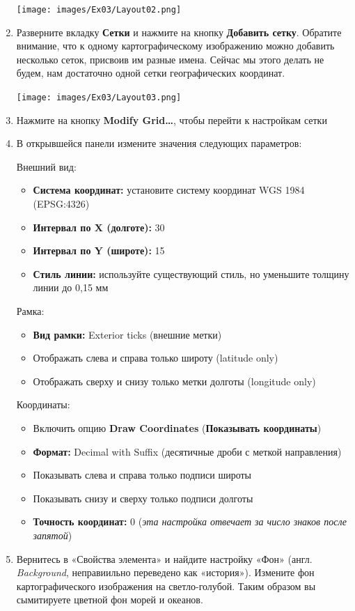 \documentclass[
  12pt,
]{book}
\providecommand{\tightlist}{%
  \setlength{\itemsep}{0pt}\setlength{\parskip}{0pt}}
\begin{document}
\begin{enumerate}
  \texttt{[image: images/Ex03/Layout02.png]}
\item
  Разверните вкладку \textbf{Сетки} и нажмите на кнопку \textbf{Добавить сетку}. Обратите внимание, что к одному картографическому изображению можно добавить несколько сеток, присвоив им разные имена. Сейчас мы этого делать не будем, нам достаточно одной сетки географических координат.

  \texttt{[image: images/Ex03/Layout03.png]}
\item
  Нажмите на кнопку \textbf{Modify Grid\ldots{}}, чтобы перейти к настройкам сетки
\item
  В открывшейся панели измените значения следующих параметров:

  Внешний вид:

  \begin{itemize}
  \tightlist
  \item
    \textbf{Система координат:} установите систему координат WGS 1984 (EPSG:4326)
  \item
    \textbf{Интервал по X (долготе):} 30
  \item
    \textbf{Интервал по Y (широте):} 15
  \item
    \textbf{Стиль линии:} используйте существующий стиль, но уменьшите толщину линии до 0,15 мм
  \end{itemize}

  Рамка:

  \begin{itemize}
  \tightlist
  \item
    \textbf{Вид рамки:} Exterior ticks (внешние метки)
  \item
    Отображать слева и справа только широту (latitude only)
  \item
    Отображать сверху и снизу только метки долготы (longitude only)
  \end{itemize}

  Координаты:

  \begin{itemize}
  \tightlist
  \item
    Включить опцию \textbf{Draw Coordinates} (\textbf{Показывать координаты})
  \item
    \textbf{Формат:} Decimal with Suffix (десятичные дроби с меткой направления)
  \item
    Показывать слева и справа только подписи широты
  \item
    Показывать снизу и сверху только подписи долготы
  \item
    \textbf{Точность координат:} 0 (\emph{эта настройка отвечает за число знаков после запятой})
  \end{itemize}
\item
  Вернитесь в «Свойства элемента» и найдите настройку «Фон» (англ. \emph{Background}, неправиильно переведено как «история»). Измените фон картографического изображения на светло-голубой. Таким образом вы сымитируете цветной фон морей и океанов.


\end{enumerate}
\end{document}
